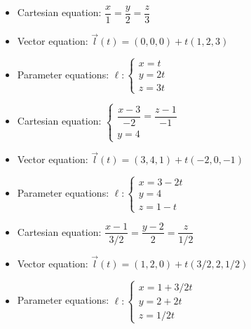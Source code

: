 \begin{Answer}\phantom{}
     
		\Question 
		    \begin{itemize}
            \item Cartesian equation: $\dfrac{x}{1} = \dfrac{y}{2} = \dfrac{z}{3} $ \\[0.1cm]
            \item Vector equation: $\vec l(t) = (0,0,0) + t (1,2,3)$ \\[0.1cm]
            \item Parameter equations: $\ell: \left\{ \begin{array}{l} x = t \\ y = 2t \\ z = 3t \end{array} \right.$\\[0.1cm]
            \end{itemize}
		\Question 
		 \begin{itemize}
            \item Cartesian equation: $\left\{ \begin{array}{l} \dfrac{x-3}{-2} = \dfrac{z-1}{-1} \\
            y=4 \end{array} \right.$ \\[0.1cm]
            \item Vector equation: $\vec l(t) = (3,4,1) + t (-2,0,-1)$ \\[0.1cm]
            \item Parameter equations: $\ell: \left\{ \begin{array}{l} x = 3-2t \\ y = 4 \\ z = 1-t \end{array} \right.$\\[0.1cm]
            \end{itemize}
		\Question 
		\begin{itemize}
            \item Cartesian equation: $\dfrac{x-1}{3/2} = \dfrac{y-2}{2} = \dfrac{z}{1/2}$ \\[0.1cm]
            \item Vector equation: $\vec l(t) = (1,2,0) + t (3/2,2,1/2)$ \\[0.1cm]
            \item Parameter equations: $\ell: \left\{ \begin{array}{l} x = 1+3/2t \\ y = 2+2t \\ z = 1/2t \end{array} \right.$\\[0.1cm]

\end{itemize}
\end{Answer}
